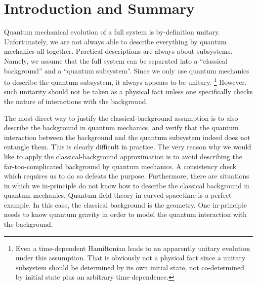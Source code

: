 \documentclass[aps,showpacs,twocolumn,floats,prd,superscriptaddress,nofootinbib]{revtex4-1}
\begin{document}
\maketitle


\onecolumngrid

\section{Introduction and Summary}

Quantum mechanical evolution of a full system is by-definition unitary. 
Unfortunately, we are not always able to describe everything by quantum mechanics all together. 
Practical descriptions are always about subsystems. 
Namely, we assume that the full system can be separated into a ``classical background'' and a ``quantum subsystem''. 
Since we only use quantum mechanics to describe the quantum subsystem, it always appears to be unitary.
\footnote{Even a time-dependent Hamiltonian leads to an apparently unitary evolution under this assumption. That is obviously not a physical fact since a unitary subsystem should be determined by its own initial state, not co-determined by initial state plus an arbitrary time-dependence.} 
However, such unitarity should not be taken as a physical fact unless one specifically checks the nature of interactions with the background.

The most direct way to justify the classical-background assumption is to also describe the background in quantum mechanics, and verify that the quantum interaction between the background and the quantum subsystem indeed does not entangle them. 
This is clearly difficult in practice. 
The very reason why we would like to apply the classical-background approximation is to avoid describing the far-too-complicated background by quantum mechanics. 
A consistency check which requires us to do so defeats the purpose. 
Furthermore, there are situations in which we in-principle do not know how to describe the classical background in quantum mechanics. 
Quantum field theory in curved spacetime is a perfect example. 
In this case, the classical background is the geometry.
One in-principle needs to know quantum gravity in order to model the quantum interaction with the background. 
\end{document}
